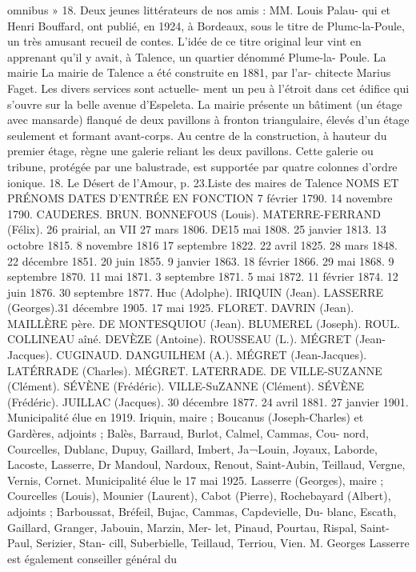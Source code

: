 \documentclass[a4paper,11pt]{book}
\begin{document}
omnibus » 18.
Deux jeunes littérateurs de nos amis : MM. Louis Palau-
qui et Henri Bouffard, ont publié, en 1924, à Bordeaux,
sous le titre de Plumc-la-Poule, un très amusant recueil de
contes. L'idée de ce titre original leur vint en apprenant
qu'il y avait, à Talence, un quartier dénommé Plume-la-
Poule.
La mairie
La mairie de Talence a été construite en 1881, par l'ar-
chitecte Marius Faget. Les divers services sont actuelle-
ment un peu à l'étroit dans cet édifice qui s'ouvre sur la
belle avenue d'Espeleta.
La mairie présente un bâtiment (un étage avec mansarde)
flanqué de deux pavillons à fronton triangulaire, élevés
d'un étage seulement et formant avant-corps. Au centre de
la construction, à hauteur du premier étage, règne une
galerie reliant les deux pavillons. Cette galerie ou tribune,
protégée par une balustrade, est supportée par quatre
colonnes d'ordre ionique.
18. Le Désert de l'Amour, p. 23.Liste des maires de Talence
NOMS ET PRÉNOMS
DATES D'ENTRÉE EN FONCTION
7 février 1790.
14 novembre 1790.
CAUDERES.
BRUN.
BONNEFOUS (Louis).
MATERRE-FERRAND (Félix).
26 prairial, an VII
27 mars 1806.
DE15 mai 1808.
25 janvier 1813.
13 octobre 1815.
8 novembre 1816
17 septembre 1822.
22 avril 1825.
28 mars 1848.
22 décembre 1851.
20 juin 1855.
9 janvier 1863.
18 février 1866.
29 mai 1868.
9 septembre 1870.
11 mai 1871.
3 septembre 1871.
5 mai 1872.
11 février 1874.
12 juin 1876.
30 septembre 1877.
Huc (Adolphe).
IRIQUIN (Jean).
LASSERRE (Georges).31 décembre 1905.
17 mai 1925.
FLORET.
DAVRIN (Jean).
MAILLÈRE père.
DE MONTESQUIOU (Jean).
BLUMEREL (Joseph).
ROUL.
COLLINEAU aîné.
DEVÈZE (Antoine).
ROUSSEAU (L.).
MÉGRET (Jean-Jacques).
CUGINAUD.
DANGUILHEM (A.).
MÉGRET (Jean-Jacques).
LATÉRRADE (Charles).
MÉGRET.
LATERRADE.
DE VILLE-SUZANNE (Clément).
SÉVÈNE (Frédéric).
VILLE-SuZANNE (Clément).
SÉVÈNE (Frédéric).
JUILLAC (Jacques).
30 décembre 1877.
24 avril 1881.
27 janvier 1901.
Municipalité élue en 1919.
Iriquin, maire ; Boucanus (Joseph-Charles) et Gardères,
adjoints ; Balès, Barraud, Burlot, Calmel, Cammas, Cou-
nord, Courcelles, Dublanc, Dupuy, Gaillard, Imbert, Ja¬Louin, Joyaux, Laborde, Lacoste, Lasserre, Dr Mandoul,
Nardoux, Renout, Saint-Aubin, Teillaud, Vergne, Vernis,
Cornet.
Municipalité élue le 17 mai 1925.
Lasserre (Georges), maire ; Courcelles (Louis), Mounier
(Laurent), Cabot (Pierre), Rochebayard (Albert), adjoints ;
Barboussat, Bréfeil, Bujac, Cammas, Capdevielle, Du-
blanc, Escath, Gaillard, Granger, Jabouin, Marzin, Mer-
let, Pinaud, Pourtau, Rispal, Saint-Paul, Serizier, Stan-
cill, Suberbielle, Teillaud, Terriou, Vien.
M. Georges Lasserre est également conseiller général du
\end{document}
